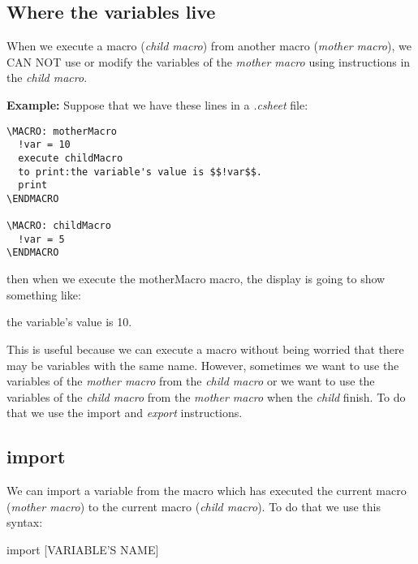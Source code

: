 \documentclass[11pt,a4paper,openright,oneside]{book}
\newenvironment{ex}
{
  \setlength{\parindent}{0cm}
  \large \textbf{Example:} \normalsize 
}
{}
\begin{document}
\subsection{Where the variables live}

When we execute a macro (\textit{child macro}) from another macro (\textit{mother macro}), we CAN NOT use or modify the variables of the \textit{mother macro} using instructions in the \textit{child macro}. 

\begin{ex} Suppose that we have these lines in a \textit{.csheet} file:
  \begin{lstlisting}
\MACRO: motherMacro
  !var = 10
  execute childMacro
  to print:the variable's value is $$!var$$.
  print
\ENDMACRO

\MACRO: childMacro
  !var = 5
\ENDMACRO
  \end{lstlisting}
then when we execute the \textsf{motherMacro} macro, the display is going to show something like:
\vspace{5px}

\textsf{the variable's value is 10.} \\
  
\end{ex}

This is useful because we can execute a macro without being worried that there may be variables with the same name. However, sometimes we want to use the variables of the \textit{mother macro} from the \textit{child macro} or we want to use the variables of the \textit{child macro} from the \textit{mother macro} when the \textit{child} finish. To do that we use the \textsf{import} and \textit{export} instructions.

\subsection{\textsf{import}}

We can import a variable from the macro which has executed the current macro (\textit{mother macro}) to the current macro (\textit{child macro}). To do that we use this syntax:
\begin{center} \textsf{import \textsc{\scriptsize[VARIABLE'S NAME]}} \end{center}
\end{document}
